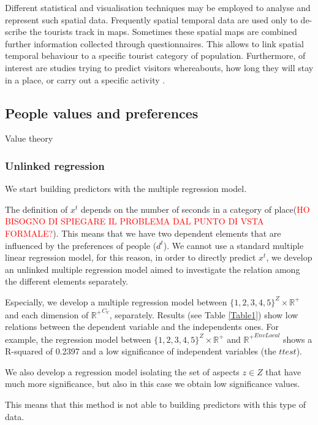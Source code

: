 \documentclass[a4paper]{article}
\begin{document}
Different statistical and visualisation techniques may be employed to analyse and represent such spatial data. Frequently spatial temporal data are used only to de-scribe the tourists track in maps. Sometimes these spatial maps are combined further information collected through questionnaires. This allows to link spatial temporal behaviour to a specific tourist category of population. Furthermore, of interest are studies trying to predict visitors whereabouts, how long they will stay in a place, or carry out a specific activity \cite{Chhetri2010}.


\subsection{People values and preferences}
Value theory





\subsubsection{Unlinked regression}
We start building predictors with the multiple regression model.

The definition of $x^t$ depends on the number of seconds in a category of place(\textcolor{red}{HO BISOGNO DI SPIEGARE IL PROBLEMA DAL PUNTO DI VSTA FORMALE?}).  This means that we have two dependent elements that are influenced  by the preferences of people ($d^t$). We cannot use a standard multiple linear regression model, for this reason, in order to directly predict $x^t$, we develop an unlinked  multiple regression model aimed to investigate the relation among the different elements separately.

Especially, we develop a multiple regression model between ${\{1, 2, 3, 4, 5\}}^Z \times {\mathbb{R}^+}$ and each dimension of ${\mathbb{R}^+}^{C_V}$, separately.
Results (see Table \ref{Table1}) show low relations between the dependent variable and the independents ones. For example, the regression model between  ${\{1, 2, 3, 4, 5\}}^Z \times {\mathbb{R}^+}$ and ${\mathbb{R}^+}^{EnvLocal}$ shows a R-squared of 0.2397 and a low significance of  independent variables (the $t test$).

We also develop a regression model isolating the set of aspects $z \in Z$ that have much more significance, but also in this case we obtain low significance values.

This means that this method is not able to building predictors with this type of data.
\end{document}
